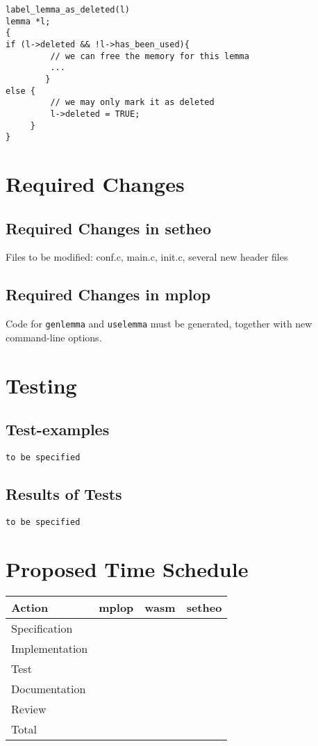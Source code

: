 \begin{verbatim}
label_lemma_as_deleted(l)
lemma *l;
{
if (l->deleted && !l->has_been_used){
         // we can free the memory for this lemma
         ...
        }
else {
         // we may only mark it as deleted
         l->deleted = TRUE;
     }
}
\end{verbatim}

\section{Required Changes}
\subsection{Required Changes in setheo}

Files to be modified:
conf.c, main.c, init.c, several new header files

\subsection{Required Changes in mplop}

Code for {\tt genlemma} and {\tt uselemma} must be generated,
together with new command-line options.

\section{Testing}
\subsection{Test-examples}
{\tt to be specified}

\subsection{Results of Tests}
{\tt to be specified}


\section{Proposed Time Schedule}

\begin{center}
\begin{tabular}{|l|r|r|r|}
\hline\hline
Action & mplop & wasm & setheo \\
\hline
Specification & & & \\
Implementation & & & \\
Test & & & \\
Documentation & & & \\
Review & & & \\
\hline
Total & & & \\
\hline\hline
\end{tabular}
\end{center}



